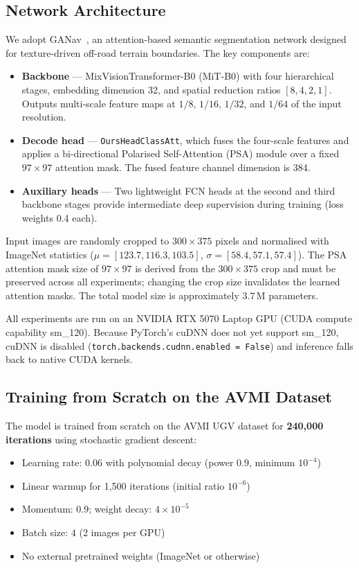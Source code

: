 \subsection{Network Architecture}

We adopt GANav~\cite{ganav2022}, an attention-based semantic segmentation
network designed for texture-driven off-road terrain boundaries.  The key
components are:

\begin{itemize}
    \item \textbf{Backbone} --- MixVisionTransformer-B0 (MiT-B0) with four
          hierarchical stages, embedding dimension 32, and spatial reduction
          ratios $[8,4,2,1]$.  Outputs multi-scale feature maps at
          $1/8$, $1/16$, $1/32$, and $1/64$ of the input resolution.
    \item \textbf{Decode head} --- \texttt{OursHeadClassAtt}, which fuses
          the four-scale features and applies a bi-directional Polarised
          Self-Attention (PSA) module over a fixed $97\times97$ attention
          mask.  The fused feature channel dimension is 384.
    \item \textbf{Auxiliary heads} --- Two lightweight FCN heads at the
          second and third backbone stages provide intermediate deep
          supervision during training (loss weights 0.4 each).
\end{itemize}

Input images are randomly cropped to $300\times375$ pixels and normalised
with ImageNet statistics ($\mu=[123.7, 116.3, 103.5]$,
$\sigma=[58.4, 57.1, 57.4]$).  The PSA attention mask size of $97\times97$
is derived from the $300\times375$ crop and must be preserved across all
experiments; changing the crop size invalidates the learned attention masks.
The total model size is approximately $3.7\,\text{M}$ parameters.

All experiments are run on an NVIDIA RTX 5070 Laptop GPU (CUDA compute
capability sm\_120).  Because PyTorch's cuDNN does not yet support sm\_120,
cuDNN is disabled (\texttt{torch.backends.cudnn.enabled = False}) and
inference falls back to native CUDA kernels.

\subsection{Training from Scratch on the AVMI Dataset}

The model is trained from scratch on the AVMI UGV dataset for
\textbf{240,000 iterations} using stochastic gradient descent:
\begin{itemize}
    \item Learning rate: $0.06$ with polynomial decay (power $0.9$,
          minimum $10^{-4}$)
    \item Linear warmup for 1,500 iterations (initial ratio $10^{-6}$)
    \item Momentum: $0.9$; weight decay: $4\times10^{-5}$
    \item Batch size: $4$ (2 images per GPU)
    \item No external pretrained weights (ImageNet or otherwise)
\end{itemize}

